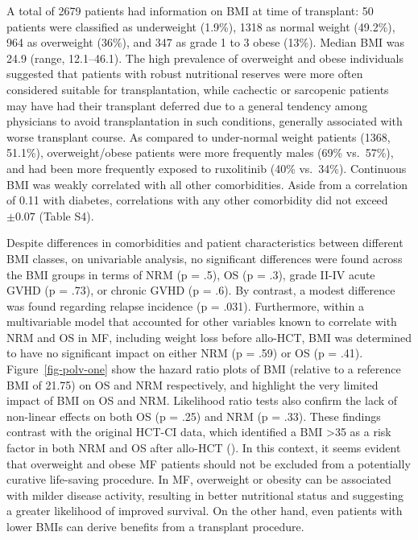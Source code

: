 \documentclass[
  letterpaper,
  DIV=11,
  numbers=noendperiod]{scrreprt}
\begin{document}
A total of 2679 patients had information on BMI at time of transplant:
50 patients were classified as underweight (1.9\%), 1318 as normal
weight (49.2\%), 964 as overweight (36\%), and 347 as grade 1 to 3 obese
(13\%). Median BMI was 24.9 (range, 12.1--46.1). The high prevalence of
overweight and obese individuals suggested that patients with robust
nutritional reserves were more often considered suitable for
transplantation, while cachectic or sarcopenic patients may have had
their transplant deferred due to a general tendency among physicians to
avoid transplantation in such conditions, generally associated with
worse transplant course. As compared to under-normal weight patients
(1368, 51.1\%), overweight/obese patients were more frequently males
(69\% vs.~57\%), and had been more frequently exposed to ruxolitinib
(40\% vs.~34\%). Continuous BMI was weakly correlated with all other
comorbidities. Aside from a correlation of 0.11 with diabetes,
correlations with any other comorbidity did not exceed \(\pm0.07\)
(Table S4).

Despite differences in comorbidities and patient characteristics between
different BMI classes, on univariable analysis, no significant
differences were found across the BMI groups in terms of NRM (p = .5),
OS (p = .3), grade II-IV acute GVHD (p = .73), or chronic GVHD (p = .6).
By contrast, a modest difference was found regarding relapse incidence
(p = .031). Furthermore, within a multivariable model that accounted for
other variables known to correlate with NRM and OS in MF, including
weight loss before allo-HCT, BMI was determined to have no significant
impact on either NRM (p = .59) or OS (p = .41).
Figure~\ref{fig-polv-one} show the hazard ratio plots of BMI (relative
to a reference BMI of 21.75) on OS and NRM respectively, and highlight
the very limited impact of BMI on OS and NRM. Likelihood ratio tests
also confirm the lack of non-linear effects on both OS (p = .25) and NRM
(p = .33). These findings contrast with the original HCT-CI data, which
identified a BMI \textgreater35 as a risk factor in both NRM and OS
after allo-HCT
(). In this context, it seems evident that overweight
and obese MF patients should not be excluded from a potentially curative
life-saving procedure. In MF, overweight or obesity can be associated
with milder disease activity, resulting in better nutritional status and
suggesting a greater likelihood of improved survival. On the other hand,
even patients with lower BMIs can derive benefits from a transplant
procedure.
\end{document}
